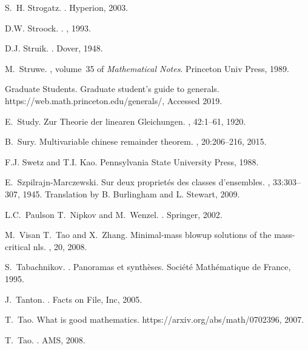 \documentclass[12pt]{amsart}
\begin{document}
\begin{thebibliography}{100}
S.~H. Strogatz.
.
\newblock Hyperion, 2003.

D.W. Stroock.
.
, 1993.

D.J. Struik.
.
\newblock Dover, 1948.

M.~Struwe.
, volume~35 of
  {\em Mathematical Notes}.
\newblock Princeton Univ Press, 1989.

Graduate Students.
\newblock Graduate student's guide to generals.
\newblock https://web.math.princeton.edu/generals/, Accessed 2019.

E.~Study.
\newblock Zur {T}heorie der linearen {G}leichungen.
, 42:1--61, 1920.

B.~Sury.
\newblock Multivariable chinese remainder theorem.
, 20:206--216, 2015.

F.J. Swetz and T.I. Kao.
\newblock Pennsylvania State University Press, 1988.

E.~Szpilrajn-Marczewski.
\newblock Sur deux propriet\'es des classes d'ensembles.
, 33:303--307, 1945.
\newblock Translation by B. Burlingham and L. Stewart, 2009.

L.C.~Paulson T.~Nipkov and M.~Wenzel.
.
\newblock Springer, 2002.

M.~Visan T.~Tao and X.~Zhang.
\newblock Minimal-mass blowup solutions of the mass-critical nls.
, 20, 2008.

S.~Tabachnikov.
.
\newblock Panoramas et synth\`eses. Soci\'et\'e Math\'ematique de France, 1995.

J.~Tanton.
.
\newblock Facts on File, Inc, 2005.

T.~Tao.
\newblock What is good mathematics.
\newblock https://arxiv.org/abs/math/0702396, 2007.

T.~Tao.
.
\newblock AMS, 2008.


\end{thebibliography}
\end{document}
